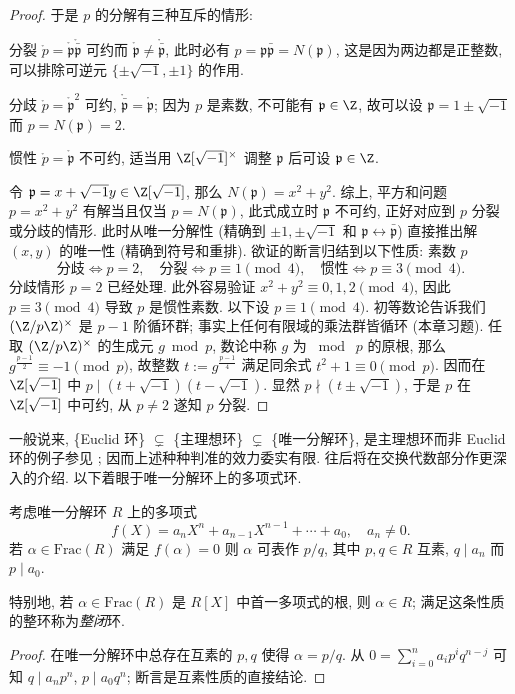 \begin{proof}
	于是 $p$ 的分解有三种互斥的情形:
	\begin{compactdesc}
		\item[分裂] $\mathring{p} = \mathring{\mathfrak{p}} \mathring{\bar{\mathfrak{p}}}$ 可约而 $\mathring{\mathfrak{p}} \neq \mathring{\bar{\mathfrak{p}}}$, 此时必有 $p = \mathfrak{p}\bar{\mathfrak{p}} = N(\mathfrak{p})$, 这是因为两边都是正整数, 可以排除可逆元 $\{\pm\sqrt{-1}, \pm 1\}$ 的作用.
		\item[分歧] $\mathring{p} = \mathring{\mathfrak{p}}^2$ 可约, $\mathring{\bar{\mathfrak{p}}} = \mathring{\mathfrak{p}}$; 因为 $p$ 是素数, 不可能有 $\mathfrak{p} \in \Z$, 故可以设 $\mathfrak{p} = 1 \pm \sqrt{-1}$ 而 $p = N(\mathfrak{p}) = 2$.
		\item[惯性] $\mathring{p} = \mathring{\mathfrak{p}}$ 不可约, 适当用 $\Z[\sqrt{-1}]^\times$ 调整 $\mathfrak{p}$ 后可设 $\mathfrak{p} \in \Z$.
	\end{compactdesc}
	令 $\mathfrak{p} = x + \sqrt{-1}y \in \Z[\sqrt{-1}]$, 那么 $N(\mathfrak{p}) = x^2 + y^2$. 综上, 平方和问题 $p = x^2 + y^2$ 有解当且仅当 $p = N(\mathfrak{p})$, 此式成立时 $\mathfrak{p}$ 不可约, 正好对应到 $p$ 分裂或分歧的情形. 此时从唯一分解性 (精确到 $\pm 1, \pm\sqrt{-1}$ 和 $\mathfrak{p} \leftrightarrow \bar{\mathfrak{p}}$) 直接推出解 $(x,y)$ 的唯一性 (精确到符号和重排). 欲证的断言归结到以下性质: 素数 $p$
	\[ \text{分歧} \iff p=2, \quad \text{分裂} \iff p \equiv 1 \pmod{4}, \quad \text{惯性} \iff p \equiv 3 \pmod{4}. \]
	分歧情形 $p=2$ 已经处理. 此外容易验证 $x^2 + y^2 \equiv 0,1,2 \pmod{4}$, 因此 $p \equiv 3 \pmod{4}$ 导致 $p$ 是惯性素数. 以下设 $p \equiv 1 \pmod{4}$. 初等数论告诉我们 $(\Z/p\Z)^\times$ 是 $p-1$ 阶循环群; 事实上任何有限域的乘法群皆循环 (本章习题). 任取 $(\Z/p\Z)^\times$ 的生成元 $g \bmod p$, 数论中称 $g$ 为 $\bmod\; p$ 的原根, 那么 $g^{\frac{p-1}{2}} \equiv -1 \pmod p$, 故整数 $t := g^{\frac{p-1}{4}}$ 满足同余式 $t^2 + 1 \equiv 0 \pmod p$. 因而在 $\Z[\sqrt{-1}]$ 中 $p  \mid  (t + \sqrt{-1})(t - \sqrt{-1})$. 显然 $p \nmid (t \pm \sqrt{-1})$, 于是 $p$ 在 $\Z[\sqrt{-1}]$ 中可约, 从 $p \neq 2$ 遂知 $p$ 分裂.
\end{proof}

一般说来, \{Euclid 环\} $\subsetneq$ \{主理想环\} $\subsetneq$ \{唯一分解环\}, 是主理想环而非 Euclid 环的例子参见 \cite{Wil73}; 因而上述种种判准的效力委实有限. 往后将在交换代数部分作更深入的介绍. 以下着眼于唯一分解环上的多项式环.

\begin{proposition}[一次因式检验法]
	考虑唯一分解环 $R$ 上的多项式
	\[ f(X) = a_n X^n + a_{n-1}X^{n-1} + \cdots + a_0, \quad a_n \neq 0. \]
	若 $\alpha  \in \text{Frac}(R)$ 满足 $f(\alpha)=0$ 则 $\alpha$ 可表作 $p/q$, 其中 $p,q \in R$ 互素, $q \mid a_n$ 而 $p \mid a_0$.
\end{proposition}
特别地, 若 $\alpha \in \text{Frac}(R)$ 是 $R[X]$ 中首一多项式的根, 则 $\alpha \in R$; 满足这条性质的整环称为\emph{整闭}环. 
\begin{proof}
	在唯一分解环中总存在互素的 $p,q$ 使得 $\alpha = p/q$. 从 $0 = \sum_{i=0}^n a_i p^i q^{n-j}$ 可知 $q  \mid  a_n p^n$, $p  \mid  a_0 q^n$; 断言是互素性质的直接结论.
\end{proof}


